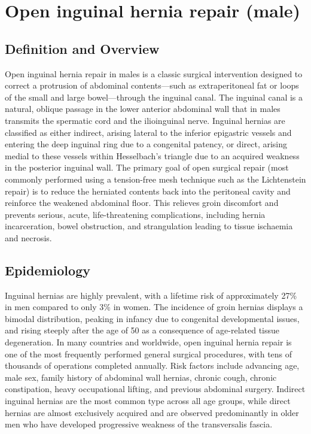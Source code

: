 \chapter{Open inguinal hernia repair (male)}

\section*{Definition and Overview}
Open inguinal hernia repair in males is a classic surgical intervention designed to correct a protrusion of abdominal contents—such as extraperitoneal fat or loops of the small and large bowel—through the inguinal canal. The inguinal canal is a natural, oblique passage in the lower anterior abdominal wall that in males transmits the spermatic cord and the ilioinguinal nerve. Inguinal hernias are classified as either indirect, arising lateral to the inferior epigastric vessels and entering the deep inguinal ring due to a congenital patency, or direct, arising medial to these vessels within Hesselbach's triangle due to an acquired weakness in the posterior inguinal wall. The primary goal of open surgical repair (most commonly performed using a tension-free mesh technique such as the Lichtenstein repair) is to reduce the herniated contents back into the peritoneal cavity and reinforce the weakened abdominal floor. This relieves groin discomfort and prevents serious, acute, life-threatening complications, including hernia incarceration, bowel obstruction, and strangulation leading to tissue ischaemia and necrosis.

\section*{Epidemiology}
Inguinal hernias are highly prevalent, with a lifetime risk of approximately 27\% in men compared to only 3\% in women. The incidence of groin hernias displays a bimodal distribution, peaking in infancy due to congenital developmental issues, and rising steeply after the age of 50 as a consequence of age-related tissue degeneration. In many countries and worldwide, open inguinal hernia repair is one of the most frequently performed general surgical procedures, with tens of thousands of operations completed annually. Risk factors include advancing age, male sex, family history of abdominal wall hernias, chronic cough, chronic constipation, heavy occupational lifting, and previous abdominal surgery. Indirect inguinal hernias are the most common type across all age groups, while direct hernias are almost exclusively acquired and are observed predominantly in older men who have developed progressive weakness of the transversalis fascia.

